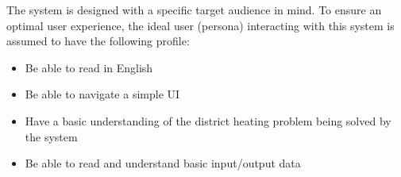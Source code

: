 \hspace*{1cm}The system is designed with a specific target audience in mind. To ensure an optimal user experience, the ideal user (persona) interacting with this system is assumed to have the following profile:
\begin{itemize}
    \item Be able to read in English
    \item Be able to navigate a simple UI
    \item Have a basic understanding of the district heating problem being solved by the system
    \item Be able to read and understand basic input/output data
\end{itemize}

\clearpage
\printbibliography[heading=bibnumbered, title={References}]
